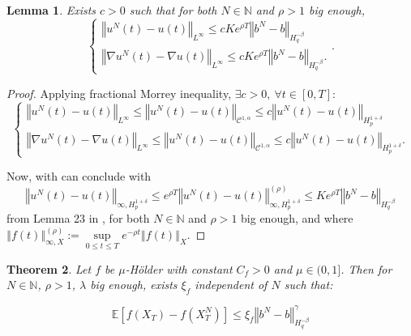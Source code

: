 \documentclass{article}[12pt]
\newtheorem{theo}{Theorem}
\newtheorem{lem}[theo]{Lemma}
\newcommand{\norme}[1]{\left\Vert #1\right\Vert}
\newcommand{\N}{\mathbb{N}}
\newcommand{\E}{\mathbb{E}}
\begin{document}
%
\begin{lem}\label{morrey} Exists $c>0$ such that for both $N\in\N$ and $\rho>1$ big enough, 
    \begin{equation}
    \begin{cases}
    \norme{u^N(t) - u(t)}_{L^\infty}\leq cKe^{\rho T}\norme{b^N-b}_{H^{-\beta}_{q}}\\        
    \norme{\nabla u^N(t) - \nabla u(t)}_{L^\infty}\leq c Ke^{\rho T}\norme{b^N-b}_{H^{-\beta}_{q}}.
    \end{cases} .
    \end{equation}
\end{lem}    

\begin{proof}
    Applying fractional Morrey inequality, $\exists c>0,\ \forall t\in[0,T]$:
    \begin{equation*}
    \begin{cases}
    \norme{u^N(t) - u(t)}_{L^\infty}\leq\norme{u^N(t) - u(t)}_{\mathcal{C}^{1,\alpha}}\leq c\norme{u^N(t)-u(t)}_{H^{1+\delta}_{p}}\\        
    \norme{\nabla u^N(t) - \nabla u(t)}_{L^\infty}\leq\norme{u^N(t) - u(t)}_{\mathcal{C}^{1,\alpha}}\leq c\norme{u^N(t)-u(t)}_{H^{1+\delta}_{p}}.
    \end{cases}        
    \end{equation*}
    
    Now, with can conclude with
    \begin{equation*}
    \norme{u^N(t)-u(t)}_{\infty,H^{1+\delta}_{p}}\leq e^{\rho T} \norme{u^N(t)-u(t)}_{\infty,H^{1+\delta}_{p}}^{(\rho)}\leq Ke^{\rho T}\norme{b^N-b}_{H^{-\beta}_{q}}
    \end{equation*} from Lemma 23 in \cite{Fla-Iss-Rus-2017}, for both $N\in\N$ and $\rho>1$ big enough, and where $\norme{f(t)}_{\infty,X}^{(\rho)} := \underset{0\leq t\leq T}{\sup} e^{-\rho t} \norme{f(t)}_X$.
\end{proof}

\begin{theo}
    Let $f$ be $\mu$-Hölder with constant $C_f>0$ and $\mu\in(0,1]$. Then for $N\in\N$, $\rho>1$, $\lambda$ big enough, exists $\xi_f$ independent of $N$ such that:
    
    \begin{equation*}
    \E\left[f\left(X_T\right)-f\left(X_T^N\right)\right] \leq \xi_f \norme{b^N-b}_{H^{-\beta}_{q}}^\gamma
    \end{equation*}
    
\end{theo}
\end{document}
